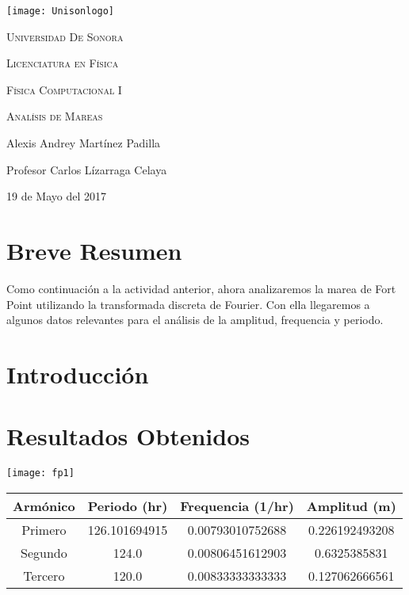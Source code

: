 \documentclass[12pt,a4paper]{article}
\begin{document}
\begin{titlepage}
	\centering
	\texttt{[image: Unisonlogo]}\par
    \vspace{1.3cm}
	\scshape \LARGE Universidad De Sonora \par
	\vspace{1cm}
	\scshape \Large Licenciatura en Física \par
    \scshape \Large Física Computacional I \par
	\vspace{1.5cm}
	\huge \scshape Analísis de Mareas \par
	\vspace{2cm}
	\Large Alexis Andrey Martínez Padilla\par
    \Large Profesor Carlos Lízarraga Celaya\par
    \vspace{2.5cm}
    \Large 19 de Mayo del 2017
\end{titlepage}

\section{Breve Resumen}

Como continuación a la actividad anterior, ahora analizaremos la marea de Fort Point utilizando la transformada discreta de Fourier. Con ella llegaremos a algunos datos relevantes para el análisis de la amplitud, frequencia y periodo.

\section{Introducción}

\newpage

\section{Resultados Obtenidos}

\begin{center}
\texttt{[image: fp1]}
\end{center}

\begin{table}[]
\centering
\label{my-label}
\begin{tabular}{|c|c|c|c|}
\hline
Armónico & Periodo (hr)  & Frequencia (1/hr) & Amplitud (m)   \\ \hline
Primero  & 126.101694915 & 0.00793010752688  & 0.226192493208 \\ \hline
Segundo  & 124.0         & 0.00806451612903  & 0.6325385831   \\ \hline
Tercero  & 120.0         & 0.00833333333333  & 0.127062666561 \\ \hline
\end{tabular}
\end{table}
\end{document}
